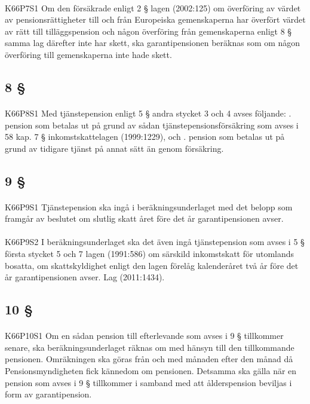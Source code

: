 \documentclass[a4paper,notitlepage,openany,10pt]{book}
\begin{document}
\paragraph*{}
{\tiny K66P7S1}
Om den försäkrade enligt 2 § lagen (2002:125) om överföring av värdet av pensionsrättigheter till och från Europeiska gemenskaperna har överfört värdet av rätt till tilläggspension och någon överföring från gemenskaperna enligt 8 § samma lag därefter inte har skett, ska garantipensionen beräknas som om någon överföring till gemenskaperna inte hade skett.
\subsection*{8 §}
\paragraph*{}
{\tiny K66P8S1}
Med tjänstepension enligt 5 § andra stycket 3 och 4 avses följande:
. pension som betalas ut på grund av sådan tjänstepensionsförsäkring som avses i 58 kap. 7 § inkomstskattelagen (1999:1229), och
. pension som betalas ut på grund av tidigare tjänst på annat sätt än genom försäkring.
\subsection*{9 §}
\paragraph*{}
{\tiny K66P9S1}
Tjänstepension ska ingå i beräkningsunderlaget med det belopp som framgår av beslutet om slutlig skatt året före det år garantipensionen avser.
\paragraph*{}
{\tiny K66P9S2}
I beräkningsunderlaget ska det även ingå tjänstepension som avses i 5 § första stycket 5 och 7 lagen (1991:586) om särskild inkomstskatt för utomlands bosatta, om skattskyldighet enligt den lagen förelåg kalenderåret två år före det år garantipensionen avser.
Lag (2011:1434).
\subsection*{10 §}
\paragraph*{}
{\tiny K66P10S1}
Om en sådan pension till efterlevande som avses i 9 § tillkommer senare, ska beräkningsunderlaget räknas om med hänsyn till den tillkommande pensionen. Omräkningen ska göras från och med månaden efter den månad då Pensionsmyndigheten fick kännedom om pensionen. Detsamma ska gälla när en pension som avses i 9 § tillkommer i samband med att ålderspension beviljas i form av garantipension.
\end{document}
